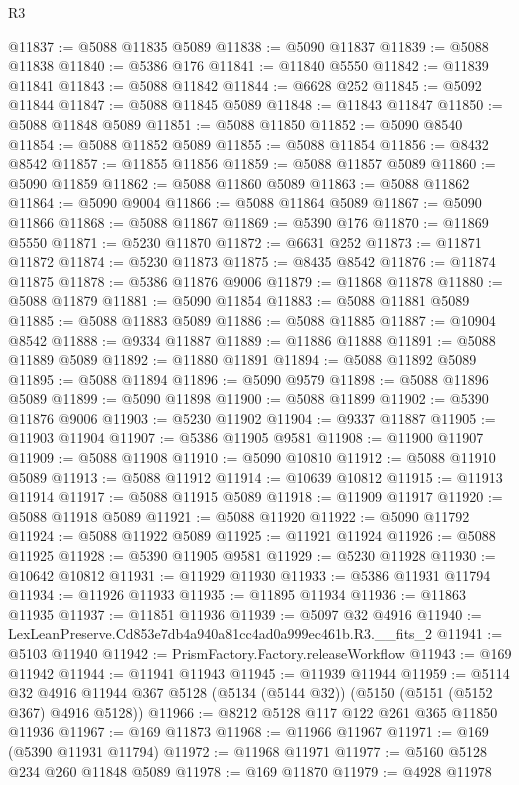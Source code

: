 \begin{lexlean}{R3}
\begin{coremodule}
@11837 := @5088 @11835 @5089
@11838 := @5090 @11837
@11839 := @5088 @11838
@11840 := @5386 @176
@11841 := @11840 @5550
@11842 := @11839 @11841
@11843 := @5088 @11842
@11844 := @6628 @252
@11845 := @5092 @11844
@11847 := @5088 @11845 @5089
@11848 := @11843 @11847
@11850 := @5088 @11848 @5089
@11851 := @5088 @11850
@11852 := @5090 @8540
@11854 := @5088 @11852 @5089
@11855 := @5088 @11854
@11856 := @8432 @8542
@11857 := @11855 @11856
@11859 := @5088 @11857 @5089
@11860 := @5090 @11859
@11862 := @5088 @11860 @5089
@11863 := @5088 @11862
@11864 := @5090 @9004
@11866 := @5088 @11864 @5089
@11867 := @5090 @11866
@11868 := @5088 @11867
@11869 := @5390 @176
@11870 := @11869 @5550
@11871 := @5230 @11870
@11872 := @6631 @252
@11873 := @11871 @11872
@11874 := @5230 @11873
@11875 := @8435 @8542
@11876 := @11874 @11875
@11878 := @5386 @11876 @9006
@11879 := @11868 @11878
@11880 := @5088 @11879
@11881 := @5090 @11854
@11883 := @5088 @11881 @5089
@11885 := @5088 @11883 @5089
@11886 := @5088 @11885
@11887 := @10904 @8542
@11888 := @9334 @11887
@11889 := @11886 @11888
@11891 := @5088 @11889 @5089
@11892 := @11880 @11891
@11894 := @5088 @11892 @5089
@11895 := @5088 @11894
@11896 := @5090 @9579
@11898 := @5088 @11896 @5089
@11899 := @5090 @11898
@11900 := @5088 @11899
@11902 := @5390 @11876 @9006
@11903 := @5230 @11902
@11904 := @9337 @11887
@11905 := @11903 @11904
@11907 := @5386 @11905 @9581
@11908 := @11900 @11907
@11909 := @5088 @11908
@11910 := @5090 @10810
@11912 := @5088 @11910 @5089
@11913 := @5088 @11912
@11914 := @10639 @10812
@11915 := @11913 @11914
@11917 := @5088 @11915 @5089
@11918 := @11909 @11917
@11920 := @5088 @11918 @5089
@11921 := @5088 @11920
@11922 := @5090 @11792
@11924 := @5088 @11922 @5089
@11925 := @11921 @11924
@11926 := @5088 @11925
@11928 := @5390 @11905 @9581
@11929 := @5230 @11928
@11930 := @10642 @10812
@11931 := @11929 @11930
@11933 := @5386 @11931 @11794
@11934 := @11926 @11933
@11935 := @11895 @11934
@11936 := @11863 @11935
@11937 := @11851 @11936
@11939 := @5097 @32 @4916
@11940 := LexLeanPreserve.Cd853e7db4a940a81cc4ad0a999ec461b.R3.__fits_2
@11941 := @5103 @11940
@11942 := PrismFactory.Factory.releaseWorkflow
@11943 := @169 @11942
@11944 := @11941 @11943
@11945 := @11939 @11944
@11959 := @5114
    @32
    @4916
    @11944
    @367
    @5128
    (@5134 (@5144 @32))
    (@5150 (@5151 (@5152 @367) @4916 @5128))
@11966 := @8212 @5128 @117 @122 @261 @365 @11850 @11936
@11967 := @169 @11873
@11968 := @11966 @11967
@11971 := @169 (@5390 @11931 @11794)
@11972 := @11968 @11971
@11977 := @5160 @5128 @234 @260 @11848 @5089
@11978 := @169 @11870
@11979 := @4928 @11978

\end{coremodule}
\end{lexlean}
